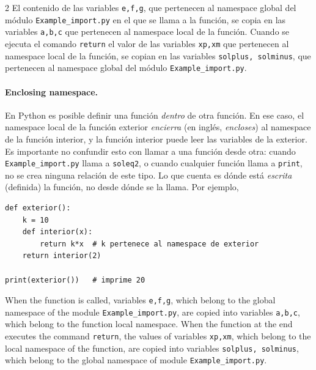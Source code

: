 \begin{paracol}{2}
El contenido de las variables \texttt{e,f,g}, que pertenecen al namespace global del módulo \texttt{Example_import.py} en el que se llama a la función, se copia en las variables \texttt{a,b,c} que pertenecen al namespace local de la función. Cuando se ejecuta el comando \texttt{return} el valor de las variables \texttt{xp,xm} que pertenecen al namespace local de la función, se copian en las variables \texttt{solplus, solminus}, que pertenecen al namespace global del módulo \texttt{Example_import.py}.

\paragraph{Enclosing namespace.} En Python es posible definir una función \emph{dentro} de otra función. En ese caso, el namespace local de la función exterior \emph{encierra} (en inglés, \emph{encloses}) al namespace de la función interior, y la función interior puede leer las variables de la exterior. Es importante no confundir esto con llamar a una función desde otra: cuando \texttt{Example_import.py} llama a \texttt{soleq2}, o cuando cualquier función llama a \texttt{print}, no se crea ninguna relación de este tipo. Lo que cuenta es dónde está \emph{escrita} (definida) la función, no desde dónde se la llama. Por ejemplo,
\begin{verbatim}
def exterior():
    k = 10
    def interior(x):
        return k*x  # k pertenece al namespace de exterior
    return interior(2)

print(exterior())   # imprime 20
\end{verbatim}
\switchcolumn
When the function is called, variables \texttt{e,f,g}, which belong to the global namespace of the module \texttt{Example_import.py}, are copied into variables  \texttt{a,b,c}, which belong to the function local namespace. When the function at the end executes the command \texttt{return}, the values of variables \texttt{xp,xm}, which belong to the local namespace of the function, are copied into variables \texttt{solplus, solminus}, which belong to the global namespace of module \texttt{Example_import.py}.


\end{paracol}
